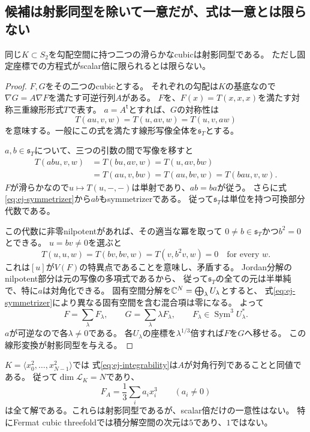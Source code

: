 \subsection{候補は射影同型を除いて一意だが、式は一意とは限らない}

\begin{proposition}[滑らかな候補の射影的一意性]
\label{prop:ej-projective-uniqueness}
同じ$K\subset S_2$を勾配空間に持つ二つの滑らかなcubicは射影同型である。
ただし固定座標での方程式がscalar倍に限られるとは限らない。
\end{proposition}
\begin{proof}
$F,G$をその二つのcubicとする。
それぞれの勾配は$K$の基底なので$\nabla G=A\nabla F$を満たす可逆行列$A$がある。
$F$を、$F(x)=T(x,x,x)$を満たす対称三重線形形式$T$で表す。
$a=A^{\mathsf t}$とすれば、$G$の対称性は
\[
 T(au,v,w)=T(u,av,w)=T(u,v,aw)
 \tag{EJ7}\label{eq:ej-symmetrizer}
\]
を意味する。一般にこの式を満たす線形写像全体を$\mathfrak s_T$とする。

$a,b\in\mathfrak s_T$について、三つの引数の間で写像を移すと
\[
 \begin{aligned}
 T(abu,v,w)&=T(bu,av,w)=T(u,av,bw)\\
 &=T(au,v,bw)=T(au,bv,w)=T(bau,v,w).
 \end{aligned}
\]
$F$が滑らかなので$u\mapsto T(u,-,-)$は単射であり、$ab=ba$が従う。
さらに式\eqref{eq:ej-symmetrizer}から$ab$もsymmetrizerである。
従って$\mathfrak s_T$は単位を持つ可換部分代数である。

この代数に非零nilpotentがあれば、その適当な冪を取って
$0\ne b\in\mathfrak s_T$かつ$b^2=0$とできる。
$u=bv\ne0$を選ぶと
\[
 T(u,u,w)=T(bv,bv,w)=T(v,b^2v,w)=0
 \quad\text{for every }w.
\]
これは$[u]$が$V(F)$の特異点であることを意味し、矛盾する。
Jordan分解のnilpotent部分は元の写像の多項式であるから、
従って$\mathfrak s_T$の全ての元は半単純で、特に$a$は対角化できる。
固有空間分解を$\mathbb C^N=\bigoplus_\lambda U_\lambda$とすると、
式\eqref{eq:ej-symmetrizer}により異なる固有空間を含む混合項は零になる。
よって
\[
 F=\sum_\lambda F_\lambda,
 \qquad G=\sum_\lambda\lambda F_\lambda,
 \qquad F_\lambda\in\operatorname{Sym}^3 U_\lambda^*.
\]
$a$が可逆なので各$\lambda\ne0$である。
各$U_\lambda$の座標を$\lambda^{1/3}$倍すれば$F$を$G$へ移せる。
この線形変換が射影同型を与える。
\end{proof}

\begin{example}[Fermatの場合の積分解]
\label{ex:ej-fermat}
$K=\langle x_0^2,\ldots,x_{N-1}^2\rangle$では
式\eqref{eq:ej-integrability}は$A$が対角行列であることと同値である。
従って$\dim\mathcal L_K=N$であり、
\[
 F_A=\frac13\sum_i a_i x_i^3\qquad(a_i\ne0)
\]
は全て解である。これらは射影同型であるが、scalar倍だけの一意性はない。
特にFermat cubic threefoldでは積分解空間の次元は$5$であり、$1$ではない。
\end{example}

